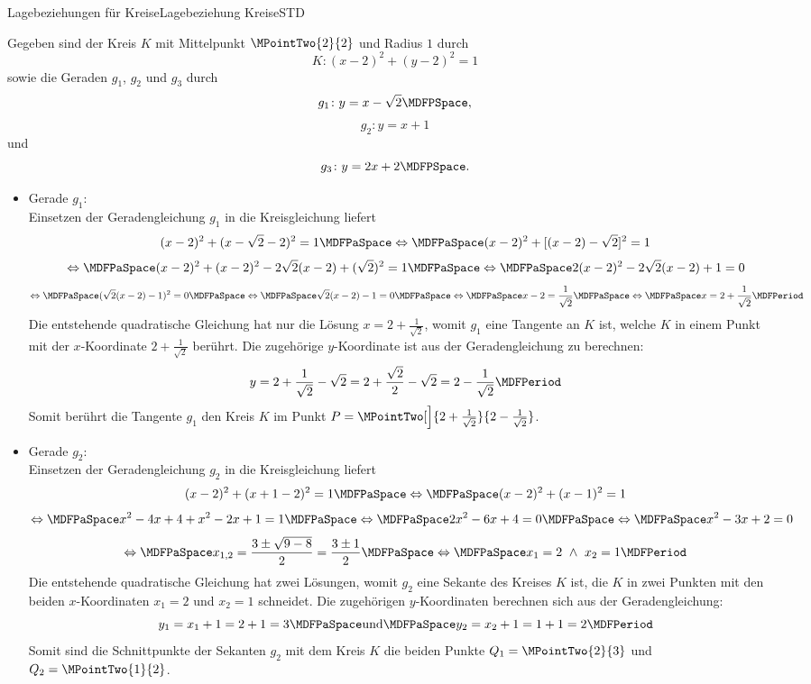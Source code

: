 \begin{MXContent}{Lagebeziehungen für Kreise}{Lagebeziehung Kreise}{STD}
\begin{MInfo}
\end{MInfo}

\begin{MExample}
Gegeben sind der Kreis $K$ mit Mittelpunkt $\MPointTwo{2}{2}$ und Radius $1$ durch
\[
 K\colon (x-2)^2 + (y-2)^2=1
\]
sowie die Geraden $g_1$, $g_2$ und $g_3$ durch
\[
 g_1\colon y=x-\sqrt{2} \MDFPSpace ,
\]
\[
 g_2\colon y=x+1
\]
und
\[
 g_3\colon y=2x+2 \MDFPSpace .
\]
\begin{itemize}
 \item Gerade $g_1$:\\
 Einsetzen der Geradengleichung $g_1$ in die Kreisgleichung liefert
 \[
  (x-2)^2 + (x-\sqrt{2}-2)^2=1\MDFPaSpace\Leftrightarrow\MDFPaSpace (x-2)^2 + [(x-2)-\sqrt{2}]^2=1
 \]
 \[
  \Leftrightarrow\MDFPaSpace (x-2)^2 + (x-2)^2 - 2\sqrt{2}(x-2)+(\sqrt{2})^2=1\MDFPaSpace\Leftrightarrow\MDFPaSpace 2(x-2)^2 - 2\sqrt{2}(x-2)+1=0 
 \]
 \[
  \Leftrightarrow\MDFPaSpace (\sqrt{2}(x-2)-1)^2=0\MDFPaSpace\Leftrightarrow\MDFPaSpace \sqrt{2}(x-2)-1=0\MDFPaSpace\Leftrightarrow\MDFPaSpace x-2=\frac{1}{\sqrt{2}}
  \MDFPaSpace\Leftrightarrow\MDFPaSpace x = 2+\frac{1}{\sqrt{2}} \MDFPeriod
 \]
 Die entstehende quadratische Gleichung hat nur die Lösung $x = 2+\frac{1}{\sqrt{2}}$, womit $g_1$ eine Tangente an $K$ ist, welche $K$ in einem Punkt mit der $x$-Koordinate $2+\frac{1}{\sqrt{2}}$ berührt. Die zugehörige $y$-Koordinate ist aus der Geradengleichung zu berechnen:
 \[
  y=2+\frac{1}{\sqrt{2}}-\sqrt{2}=2+\frac{\sqrt{2}}{2}-\sqrt{2}=2-\frac{1}{\sqrt{2}}\MDFPeriod
 \]
 Somit berührt die Tangente $g_1$ den Kreis $K$ im Punkt $P=\MPointTwo[\Big]{2+\frac{1}{\sqrt{2}}}{2-\frac{1}{\sqrt{2}}}$.
 \item Gerade $g_2$:\\
 Einsetzen der Geradengleichung $g_2$ in die Kreisgleichung liefert
 \[
  (x-2)^2 + (x+1-2)^2=1\MDFPaSpace\Leftrightarrow\MDFPaSpace (x-2)^2 + (x-1)^2=1
 \]
 \[
  \Leftrightarrow\MDFPaSpace x^2-4x+4+x^2-2x+1=1\MDFPaSpace\Leftrightarrow\MDFPaSpace 2x^2-6x+4=0\MDFPaSpace\Leftrightarrow\MDFPaSpace x^2-3x+2=0
 \]
 \[
  \Leftrightarrow\MDFPaSpace x_{1,2}=\frac{3\pm\sqrt{9-8}}{2}=\frac{3\pm 1}{2}\MDFPaSpace\Leftrightarrow\MDFPaSpace x_1=2\ \wedge\ x_2=1 \MDFPeriod
 \]
 Die entstehende quadratische Gleichung hat zwei Lösungen, womit $g_2$ eine Sekante des Kreises $K$ ist, die $K$ in zwei Punkten mit den beiden $x$-Koordinaten $x_1=2$ und $x_2=1$ schneidet. Die zugehörigen $y$-Koordinaten berechnen sich aus der Geradengleichung:
 \[
  y_1=x_1+1=2+1=3\MDFPaSpace\textrm{und}\MDFPaSpace y_2=x_2+1=1+1=2\MDFPeriod
 \]
 Somit sind die Schnittpunkte der Sekanten $g_2$ mit dem Kreis $K$ die beiden Punkte $Q_1=\MPointTwo{2}{3}$ und $Q_2=\MPointTwo{1}{2}$.

\end{itemize}
\end{MExample}
\end{MXContent}
